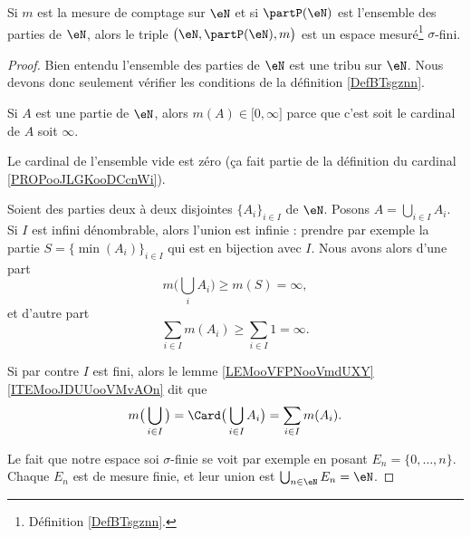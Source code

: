 \begin{lemma}       \label{LEMooDTFHooLVsvAw}
    Si \( m\) est la mesure de comptage sur \( \eN\) et si \( \partP(\eN)\) est l'ensemble des parties de \( \eN\), alors le triple \( \big( \eN,\partP(\eN), m \big)\) est un espace mesuré\footnote{Définition \ref{DefBTsgznn}.} \( \sigma\)-fini.

\end{lemma}

\begin{proof}
    Bien entendu l'ensemble des parties de \( \eN\) est une tribu sur \( \eN\). Nous devons donc seulement vérifier les conditions de la définition \ref{DefBTsgznn}.

    Si \( A\) est une partie de \( \eN\), alors \( m(A)\in \mathopen[ 0 , \infty \mathclose]\) parce que c'est soit le cardinal de \( A\) soit \( \infty\).

    Le cardinal de l'ensemble vide est zéro (ça fait partie de la définition du cardinal \ref{PROPooJLGKooDCcnWi}).

    Soient des parties deux à deux disjointes \( \{ A_i \}_{i\in I}\) de \( \eN\). Posons \( A=\bigcup_{i\in I}A_i\). Si \( I\) est infini dénombrable, alors l'union est infinie : prendre par exemple la partie \( S=\{ \min(A_i) \}_{i\in I}\) qui est en bijection avec \( I\). Nous avons alors d'une part
    \begin{equation}
        m\big( \bigcup_iA_i \big)\geq m(S)=\infty,
    \end{equation}
    et d'autre part
    \begin{equation}
        \sum_{i\in I}m(A_i)\geq \sum_{i\in I}1=\infty.
    \end{equation}
    
    Si par contre \( I\) est fini, alors le lemme \ref{LEMooVFPNooVmdUXY}\ref{ITEMooJDUUooVMvAOn} dit que
    \begin{equation}
        m\big( \bigcup_{i\in I} \big)=\Card\big( \bigcup_{i\in I}A_i \big)=\sum_{i\in I}m(A_i).
    \end{equation}

    Le fait que notre espace soi \( \sigma\)-finie se voit par exemple en posant \( E_n=\{ 0,\ldots, n \}\). Chaque \( E_n\) est de mesure finie, et leur union est \( \bigcup_{n\in \eN}E_n=\eN\).
\end{proof}


